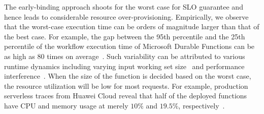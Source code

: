 The early-binding approach shoots for the worst case for SLO guarantee and hence leads to considerable resource over-provisioning. Empirically, we observe that the worst-case execution time can be orders of magnitude larger than that of the best case. For example, the gap between the 95th percentile and the 25th percentile of the workflow execution time of Microsoft Durable Functions can be as high as 80 times on average~\cite{osdi22-orion}. Such variability can be attributed to various runtime dynamics including varying input working set size~\cite{socc23-parrotfish,socc22-cypress,eurosys21-ofc,trans-xwj-1,infocom22-o2a,xbh-2,cvpr24-socialcircle,osdi22-orion,mac22-wisefuse} and performance interference~\cite{asplos23-aquatope,osdi20-firm,isca22-lukewarm,socc21-servermore,hpdc23-propack,xwj-2,wosc20-serverless-not-server-less,ic2e22-cpu-tams}. When the size of the function is decided based on the worst case, the resource utilization will be low for most requests. For example, production serverless traces from Huawei Cloud reveal that half of the deployed functions have CPU and memory usage at merely $10\%$ and $19.5\%$, respectively~\cite{socc23-huawei-cloud}. 


